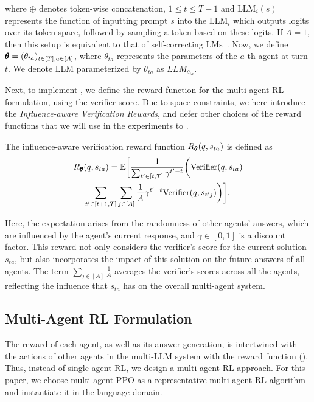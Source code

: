 \noindent where \( \oplus \) denotes token-wise concatenation, $1 \leq t \leq T-1$ and \( \text{LLM}_i(s) \) represents the function of inputting {prompt}  \( s \) into the \( \text{LLM}_i \) {which outputs logits over its token space, followed by sampling a token based on these logits.} If $A = 1$, then this setup is equivalent to that of  self-correcting LMs~\cite{madaan2024self}. Now, we define \(\pmb{\theta} = (\theta_{ta})_{t\in[T], a \in [A]}\), where \(\theta_{ta}\) represents the parameters of the \(a\)-th agent at turn \(t\). We denote LLM parameterized by  $\theta_{ta}$ as \(LLM_{\theta_{ta}}\).

Next, to implement \ourstwo, we define the reward function for the multi-agent RL formulation,   using the verifier score. {Due to space constraints, we here introduce the \textit{Influence-aware Verification Rewards}, and defer other choices of the reward functions that we will use in the experiments to .} 

\vspace{-2mm}
\begin{definition}
\label{def:infl-veri}
The influence-aware verification reward function $R_{\pmb{\theta}}(q, s_{ta})$ is defined as 
\begin{align*}
    &R_{\pmb{\theta}}(q, s_{ta}) = \mathbb{E} \bigg[\frac{1}{\sum_{t' \in [t, T]} \gamma^{t'-t}} \biggl( \text{Verifier}(q, s_{ta}) 
    \\
    &\, + \sum_{t' \in [t+1, T]}\sum_{j \in [A]} \frac{1}{A}\gamma^{t'-t}\text{Verifier}(q, s_{t'j})\biggr) \bigg].  
\end{align*}
\end{definition}

{Here, the expectation arises from the randomness of other agents' answers, which are influenced by the agent's current response, and \(\gamma \in [0,1]\) is a discount factor.}
This reward not only considers the verifier's score for the current solution \( s_{ta} \), but also incorporates the impact of this solution on the future answers of all agents. The term \( \sum_{j \in [A]} \frac{1}{A} \) averages the verifier's scores across all the agents, reflecting the influence that \( s_{ta} \) has on the overall multi-agent system.



\subsection{Multi-Agent RL Formulation}
The reward of each agent, as well as its answer generation, is intertwined with the actions of other agents in the multi-LLM system with the reward function (). Thus, instead of single-agent RL, we design a multi-agent RL approach. For this paper, we choose multi-agent PPO \citep{yu2022surprising} as a representative multi-agent RL algorithm and instantiate it in the language domain. 

